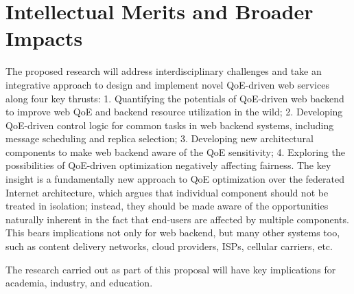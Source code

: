 \section{Intellectual Merits and Broader Impacts}

The proposed research will address interdisciplinary challenges and take an integrative approach to design and implement novel QoE-driven web services along four key thrusts: 
1. Quantifying the potentials of QoE-driven web backend to improve web QoE and backend resource utilization in the wild;
2. Developing QoE-driven control logic for common tasks in web backend systems, including message scheduling and replica selection;
3. Developing new architectural components to make web backend aware of the QoE sensitivity;
4. Exploring the possibilities of QoE-driven optimization negatively affecting fairness.
The key insight is a fundamentally new approach to QoE optimization over the federated Internet architecture, which argues that individual component should not be treated in isolation; instead, they should be made aware of the opportunities naturally inherent in the fact that end-users are affected by multiple components. 
This bears implications not only for web backend, but many other systems too, such as content delivery networks, cloud providers, ISPs, cellular carriers, etc.

The research carried out as part of this proposal will have key implications for academia, industry, and education.


